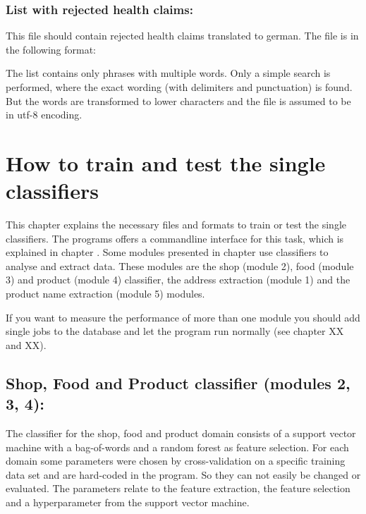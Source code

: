 \documentclass[letterpaper,10pt,english]{sphinxmanual}
\begin{document}
\subsection{List with rejected health claims:}
\label{\detokenize{online_learning:rejected-online}}\label{\detokenize{online_learning:list-with-rejected-health-claims}}
This file should contain rejected health claims translated to
german. The file is in the following format:

%
\begin{sphinxVerbatim}[commandchars=\\\{\}]
  
   
\end{sphinxVerbatim}

The list contains only phrases with multiple words. Only a simple
search is performed, where the exact wording (with delimiters and
punctuation) is found. But the words are transformed to lower characters
and the file is assumed to be in utf-8 encoding.


\chapter{How to train and test the single classifiers}
\label{\detokenize{training:how-to-train-and-test-the-single-classifiers}}\label{\detokenize{training:training}}\label{\detokenize{training::doc}}
This chapter explains the necessary files and formats to train or test
the single classifiers. The programs offers a commandline interface
for this task, which is explained in chapter {\hyperref[\detokenize{commandline:commandline}]{}}. Some
modules presented in chapter {\hyperref[\detokenize{modules:modules}]{}} use classifiers to analyse
and extract data. These modules are the shop (module 2), food
(module 3) and product (module 4) classifier, the address extraction
(module 1) and the product name extraction (module 5) modules.

If you want to measure the performance of more than one module you
should add single jobs to the database and let the program run
normally (see chapter XX and XX).


\section{Shop, Food and Product classifier (modules 2, 3, 4):}
\label{\detokenize{training:shop-food-and-product-classifier-modules-2-3-4}}\label{\detokenize{training:training-clf}}
The classifier for the shop, food and product domain consists of a
support vector machine with a bag-of-words and a random forest as
feature selection. For each domain some parameters were chosen by
cross-validation on a specific training data set and are hard-coded in
the program. So they can not easily be changed or evaluated. The
parameters relate to the feature extraction, the feature selection and
a hyperparameter from the support vector machine.
\end{document}
